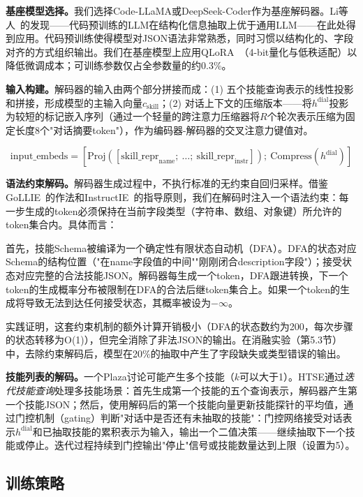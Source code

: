 \documentclass[conference]{IEEEtran}
\begin{document}
\textbf{基座模型选择。}我们选择Code-LLaMA或DeepSeek-Coder作为基座解码器。Li等人~\cite{li2024knowcoder}的发现——代码预训练的LLM在结构化信息抽取上优于通用LLM——在此处得到应用。代码预训练使得模型对JSON语法非常熟悉，同时习惯以结构化的、字段对齐的方式组织输出。我们在基座模型上应用QLoRA~\cite{dettmers2024qlora}（4-bit量化与低秩适配）以降低微调成本；可训练参数仅占全参数量的约0.3\%。

\textbf{输入构建。}解码器的输入由两个部分拼接而成：(1) 五个技能查询表示的线性投影和拼接，形成模型的主输入向量$c_{\mathrm{skill}}$；(2) 对话上下文的压缩版本——将$h^{\mathrm{dial}}$投影为较短的标记嵌入序列（通过一个轻量的跨注意力压缩器将$R$个轮次表示压缩为固定长度8个"对话摘要token"），作为编码器-解码器的交叉注意力键值对。

\begin{equation}
\text{input\_embeds} = [\mathrm{Proj}([\mathrm{skill\_repr}_{\mathrm{name}};\ \ldots;\ \mathrm{skill\_repr}_{\mathrm{instr}}]);\ \mathrm{Compress}(h^{\mathrm{dial}})]
\label{eq:decoder_input}
\end{equation}

\textbf{语法约束解码。}解码器生成过程中，不执行标准的无约束自回归采样。借鉴GoLLIE~\cite{sainz2023gollie}的作法和InstructIE~\cite{wadhwa2023instructie}的指导原则，我们在解码时注入一个语法约束：每一步生成的token必须保持在当前字段类型（字符串、数组、对象键）所允许的token集合内。具体而言：

首先，技能Schema被编译为一个确定性有限状态自动机（DFA）。DFA的状态对应Schema的结构位置（"在name字段值的中间""刚刚闭合description字段"）；接受状态对应完整的合法技能JSON。解码器每生成一个token，DFA跟进转换，下一个token的生成概率分布被限制在DFA的合法后继token集合上。如果一个token的生成将导致无法到达任何接受状态，其概率被设为$-\infty$。

实践证明，这套约束机制的额外计算开销极小（DFA的状态数约为200，每次步骤的状态转移为O(1)），但完全消除了非法JSON的输出。在消融实验（第5.3节）中，去除约束解码后，模型在20\%的抽取中产生了字段缺失或类型错误的输出。

\textbf{技能列表的解码。}一个Plaza讨论可能产生多个技能（$k$可以大于1）。HTSE通过\emph{迭代技能查询}处理多技能场景：首先生成第一个技能的五个查询表示，解码器产生第一个技能JSON；然后，使用解码后的第一个技能向量更新技能探针的平均值，通过门控机制（gating）判断"对话中是否还有未抽取的技能"：门控网络接受对话表示$h^{\mathrm{dial}}$和已抽取技能的累积表示为输入，输出一个二值决策——继续抽取下一个技能或停止。迭代过程持续到门控输出"停止"信号或技能数量达到上限（设置为5）。

\subsection{训练策略}
\end{document}
